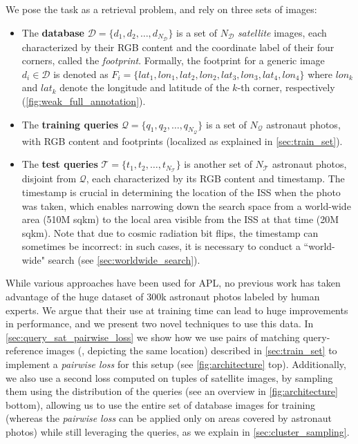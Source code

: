 We pose the task as a retrieval problem, and rely on three sets of images:
\begin{itemize}
    \item The \textbf{database} $\mathcal{D}=\{d_1, d_2, \ldots, d_{N_{\mathcal{D}}}\}$ is a set of $N_\mathcal{D}$ \emph{satellite} images, each characterized by their RGB content and the coordinate label of their four corners, called the \textit{footprint}. Formally, the footprint for a generic image $d_i \in \mathcal{D}$ is denoted as $F_i=\{lat_1, lon_1, lat_2, lon_2, lat_3, lon_3, lat_4, lon_4\}$ where $lon_k$ and $lat_k$ denote the longitude and latitude of the $k$-th corner, respectively (\cref{fig:weak_full_annotation}).
    \item The \textbf{training queries} $\mathcal{Q}=\{q_1, q_2, \ldots, q_{N_{\mathcal{Q}}}\}$ is a set of $N_{\mathcal{Q}}$ astronaut photos,  with RGB content and footprints (localized as explained in \cref{sec:train_set}).
    \item The \textbf{test queries} $\mathcal{T}=\{t_1, t_2, \ldots, t_{N_{\mathcal{T}}}\}$ is another set of $N_{\mathcal{T}}$ astronaut photos, disjoint from $\mathcal{Q}$, each characterized by its RGB content and timestamp. The timestamp is crucial in determining the location of the ISS when the photo was taken, which enables narrowing down the search space from a world-wide area (510M sqkm) to the local area visible from the ISS at that time (20M sqkm). Note that due to cosmic radiation bit flips, the timestamp can sometimes be incorrect: in such cases, it is necessary to conduct a ``world-wide" search (see \cref{sec:worldwide_search}).
\end{itemize}


While various approaches have been used for APL, no previous work has taken advantage of the huge dataset of 300k astronaut photos labeled by human experts.
We argue that their use at training time can lead to huge improvements in performance, and we present two novel techniques to use this data.
In \cref{sec:query_sat_pairwise_loss} we show how we use pairs of matching query-reference images (\ie, depicting the same location) described in \cref{sec:train_set} to implement a \textit{pairwise loss} for this setup (see \cref{fig:architecture} top).
Additionally, we also use a second loss computed on tuples of satellite images, by sampling them using the distribution of the queries (see an overview in \cref{fig:architecture} bottom), allowing us to use the entire set of database images for training (whereas the \textit{pairwise loss} can be applied only on areas covered by astronaut photos) while still leveraging the queries, as we explain in \cref{sec:cluster_sampling}.



